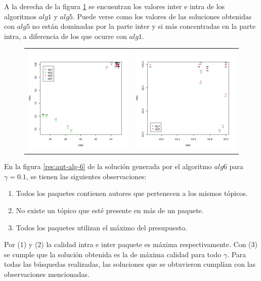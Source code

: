 A la derecha de la figura \ref{res:aut_alg1_vs_alg5_vs_alg7} se encuentran los valores inter e intra de los algoritmos $alg1$ y $alg5$. Puede verse como los valores de las soluciones obtenidas con $alg5$ no están dominadas por la parte inter y si más concentradas en la parte intra, a diferencia de los que ocurre con $alg1$.

\begin{figure}[H]
	\centering
	\begin{tabular}{cc}
			\includegraphics[width=0.45\linewidth]{img/aut-alg1-alg2-alg5-alg7.png}&
			\includegraphics[width=0.45\linewidth]{img/aut-alg1-alg5.png}\\
	\end{tabular}
	\caption{}
	\label{res:aut_alg1_vs_alg5_vs_alg7}
\end{figure}


En la figura \ref{res:aut-alg-6} de la solución generada por el algoritmo $alg6$ para $\gamma = 0.1$, se tienen las siguientes observaciones:
\begin{enumerate}
	\item Todos los paquetes contienen autores que pertenecen a los mismos tópicos. 
	\item No existe un tópico que esté presente en más de un paquete.
	\item Todos los paquetes utilizan el máximo del presupuesto.
\end{enumerate}
Por (1) y (2) la calidad intra e inter paquete es máxima respectivamente. Con (3) se cumple que la solución obtenida es la de máxima calidad para todo $\gamma$. Para todas las búsquedas realizadas, las soluciones que se obtuvieron cumplían con las observaciones mencionadas.

